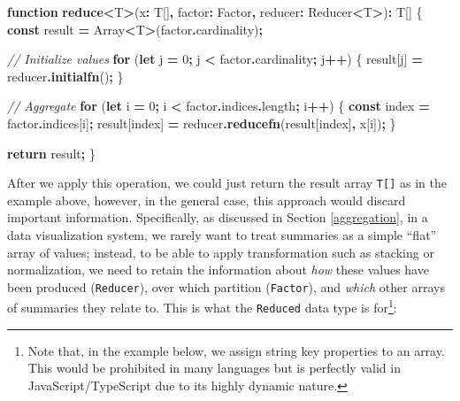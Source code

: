 \documentclass[
  openany]{book}
\newenvironment{Shaded}{\begin{snugshade}}{\end{snugshade}}
\newcommand{\AttributeTok}[1]{\textcolor[rgb]{0.13,0.29,0.53}{#1}}
\newcommand{\BuiltInTok}[1]{#1}
\newcommand{\CommentTok}[1]{\textcolor[rgb]{0.56,0.35,0.01}{\textit{#1}}}
\newcommand{\ControlFlowTok}[1]{\textcolor[rgb]{0.13,0.29,0.53}{\textbf{#1}}}
\newcommand{\DecValTok}[1]{\textcolor[rgb]{0.00,0.00,0.81}{#1}}
\newcommand{\FunctionTok}[1]{\textcolor[rgb]{0.13,0.29,0.53}{\textbf{#1}}}
\newcommand{\KeywordTok}[1]{\textcolor[rgb]{0.13,0.29,0.53}{\textbf{#1}}}
\newcommand{\NormalTok}[1]{#1}
\newcommand{\OperatorTok}[1]{\textcolor[rgb]{0.81,0.36,0.00}{\textbf{#1}}}
\theoremstyle{definition}
\theoremstyle{definition}
\theoremstyle{definition}
\theoremstyle{definition}
\theoremstyle{remark}
\begin{document}
\begin{Shaded}
\begin{Highlighting}[]
\KeywordTok{function} \FunctionTok{reduce}\OperatorTok{\textless{}}\NormalTok{T}\OperatorTok{\textgreater{}}\NormalTok{(x}\OperatorTok{:}\NormalTok{ T[]}\OperatorTok{,}\NormalTok{ factor}\OperatorTok{:}\NormalTok{ Factor}\OperatorTok{,} 
\NormalTok{                   reducer}\OperatorTok{:}\NormalTok{ Reducer}\OperatorTok{\textless{}}\NormalTok{T}\OperatorTok{\textgreater{}}\NormalTok{)}\OperatorTok{:}\NormalTok{ T[] \{}
  \KeywordTok{const}\NormalTok{ result }\OperatorTok{=} \BuiltInTok{Array}\OperatorTok{\textless{}}\NormalTok{T}\OperatorTok{\textgreater{}}\NormalTok{(factor}\OperatorTok{.}\AttributeTok{cardinality}\NormalTok{)}\OperatorTok{;}
  
  \CommentTok{// Initialize values}
  \ControlFlowTok{for}\NormalTok{ (}\KeywordTok{let}\NormalTok{ j }\OperatorTok{=} \DecValTok{0}\OperatorTok{;}\NormalTok{ j }\OperatorTok{\textless{}}\NormalTok{ factor}\OperatorTok{.}\AttributeTok{cardinality}\OperatorTok{;}\NormalTok{ j}\OperatorTok{++}\NormalTok{) \{}
\NormalTok{    result[j] }\OperatorTok{=}\NormalTok{ reducer}\OperatorTok{.}\FunctionTok{initialfn}\NormalTok{()}\OperatorTok{;}
\NormalTok{  \}}
  
  \CommentTok{// Aggregate}
  \ControlFlowTok{for}\NormalTok{ (}\KeywordTok{let}\NormalTok{ i }\OperatorTok{=} \DecValTok{0}\OperatorTok{;}\NormalTok{ i }\OperatorTok{\textless{}}\NormalTok{ factor}\OperatorTok{.}\AttributeTok{indices}\OperatorTok{.}\AttributeTok{length}\OperatorTok{;}\NormalTok{ i}\OperatorTok{++}\NormalTok{) \{}
    \KeywordTok{const}\NormalTok{ index }\OperatorTok{=}\NormalTok{ factor}\OperatorTok{.}\AttributeTok{indices}\NormalTok{[i]}\OperatorTok{;}
\NormalTok{    result[index] }\OperatorTok{=}\NormalTok{ reducer}\OperatorTok{.}\FunctionTok{reducefn}\NormalTok{(result[index]}\OperatorTok{,}\NormalTok{ x[i])}\OperatorTok{;}
\NormalTok{  \}}
  
  \ControlFlowTok{return}\NormalTok{ result}\OperatorTok{;}
\NormalTok{\}}
\end{Highlighting}
\end{Shaded}

After we apply this operation, we could just return the result array \texttt{T{[}{]}} as in the example above, however, in the general case, this approach would discard important information. Specifically, as discussed in Section \ref{aggregation}, in a data visualization system, we rarely want to treat summaries as a simple ``flat'' array of values; instead, to be able to apply transformation such as stacking or normalization, we need to retain the information about \emph{how} these values have been produced (\texttt{Reducer}), over which partition (\texttt{Factor}), and \emph{which} other arrays of summaries they relate to. This is what the \texttt{Reduced} data type is for\footnote{Note that, in the example below, we assign string key properties to an array. This would be prohibited in many languages but is perfectly valid in JavaScript/TypeScript due to its highly dynamic nature.}:
\end{document}
